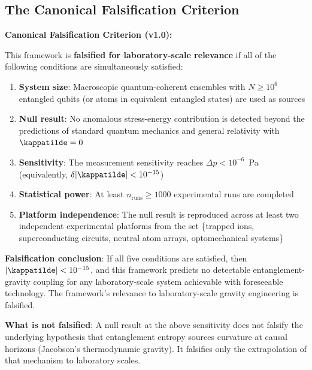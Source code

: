 \subsection{The Canonical Falsification Criterion}
\label{subsec:canonical_falsification}

\begin{framed}
\noindent\textbf{Canonical Falsification Criterion (v1.0):}

This framework is \textbf{falsified for laboratory-scale relevance}
if all of the following conditions are simultaneously satisfied:

\begin{enumerate}
    \item \textbf{System size}: Macroscopic quantum-coherent ensembles
    with $N \geq 10^6$ entangled qubits (or atoms in equivalent
    entangled states) are used as sources

    \item \textbf{Null result}: No anomalous stress-energy contribution
    is detected beyond the predictions of standard quantum mechanics and
    general relativity with $\kappatilde = 0$

    \item \textbf{Sensitivity}: The measurement sensitivity reaches
    $\Delta p < 10^{-6}$~Pa (equivalently, $\delta|\kappatilde|
    < 10^{-15}$)

    \item \textbf{Statistical power}: At least $n_{\mathrm{runs}}
    \geq 1000$ experimental runs are completed

    \item \textbf{Platform independence}: The null result is reproduced
    across at least two independent experimental platforms from the set
    \{trapped ions, superconducting circuits, neutral atom arrays,
    optomechanical systems\}
\end{enumerate}

\noindent\textbf{Falsification conclusion}: If all five conditions are
satisfied, then $|\kappatilde| < 10^{-15}$, and this framework predicts
no detectable entanglement-gravity coupling for any laboratory-scale
system achievable with foreseeable technology. The framework's relevance
to laboratory-scale gravity engineering is falsified.

\noindent\textbf{What is not falsified}: A null result at the above
sensitivity does not falsify the underlying hypothesis that entanglement
entropy sources curvature at causal horizons (Jacobson's thermodynamic
gravity). It falsifies only the extrapolation of that mechanism to
laboratory scales.
\end{framed}

